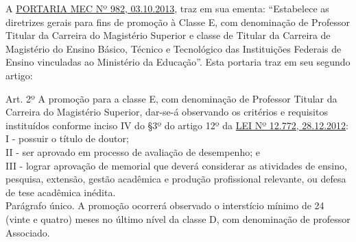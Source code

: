 A \href{https://apur.org.br/wp-content/uploads/2013/10/PORTARIA_982.pdf}{PORTARIA MEC Nº 982, 03.10.2013},  traz em sua ementa: ``Estabelece as diretrizes gerais para fins de promoção à Classe E, com denominação de Professor Titular da Carreira do Magistério Superior e classe de Titular da Carreira de Magistério do Ensino Básico, Técnico e Tecnológico das Instituições Federais de Ensino vinculadas ao Ministério da Educação''. Esta portaria traz em seu segundo artigo:
\
\begin{quoting}[rightmargin=0cm,leftmargin=2cm]
{\footnotesize 
Art. 2º A promoção para a classe E, com denominação de Professor Titular da Carreira do Magistério Superior, dar-se-á observando os critérios e requisitos instituídos conforme inciso IV do §3º do artigo 12º da \href{https://www.planalto.gov.br/ccivil_03/_ato2011-2014/2012/lei/l12772.htm}{LEI Nº 12.772, 28.12.2012}:\\
I - possuir o título de doutor;\\
II - ser aprovado em processo de avaliação de desempenho; e\\
III - lograr aprovação de memorial que deverá considerar as atividades de ensino, pesquisa, extensão, gestão acadêmica e produção profissional relevante, ou defesa de tese acadêmica inédita.\\
Parágrafo único. A promoção ocorrerá observado o interstício mínimo de 24 (vinte e quatro) meses no último nível da classe D, com denominação de professor Associado.  
}
\end{quoting}

